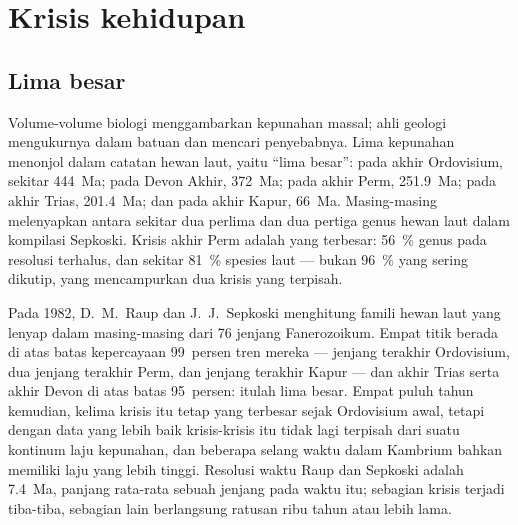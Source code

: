 \section{Krisis kehidupan}\label{sec:b2:phanerozoic-earth:extinctions}

\subsection*{Lima besar}

Volume-volume biologi menggambarkan kepunahan massal; ahli geologi mengukurnya dalam batuan dan mencari
penyebabnya. Lima kepunahan menonjol dalam catatan hewan laut, yaitu ``lima besar'': pada akhir
Ordovisium, sekitar \qty{444}{Ma}; pada Devon Akhir, \qty{372}{Ma}; pada akhir Perm,
\qty{251.9}{Ma}; pada akhir Trias, \qty{201.4}{Ma}; dan pada akhir Kapur,
\qty{66}{Ma}. Masing-masing melenyapkan antara sekitar dua perlima dan dua pertiga genus hewan
laut dalam kompilasi Sepkoski. Krisis akhir Perm adalah yang terbesar: \qty{56}{\percent}
genus pada resolusi terhalus, dan sekitar \qty{81}{\percent} spesies laut --- bukan
\qty{96}{\percent} yang sering dikutip, yang mencampurkan dua krisis yang terpisah.

\begin{history}
Pada 1982, D.~M.~Raup dan J.~J.~Sepkoski menghitung famili hewan laut yang lenyap
dalam masing-masing dari 76 jenjang Fanerozoikum. Empat titik berada di atas batas kepercayaan 99~persen
tren mereka --- jenjang terakhir Ordovisium, dua jenjang terakhir Perm, dan jenjang terakhir
Kapur --- dan akhir Trias serta akhir Devon di atas batas 95~persen:
itulah lima besar. Empat puluh tahun kemudian, kelima krisis itu tetap yang terbesar sejak
Ordovisium awal, tetapi dengan data yang lebih baik krisis-krisis itu tidak lagi terpisah dari suatu kontinum laju
kepunahan, dan beberapa selang waktu dalam Kambrium bahkan memiliki laju yang lebih tinggi. Resolusi waktu Raup dan Sepkoski
adalah \qty{7.4}{Ma}, panjang rata-rata sebuah jenjang pada waktu itu; sebagian krisis terjadi tiba-tiba, sebagian lain
berlangsung ratusan ribu tahun atau lebih lama.
\end{history}

